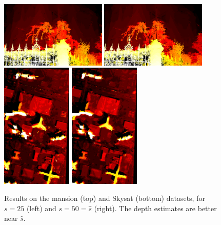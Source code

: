 \documentclass{article}
\theoremstyle{definition}
\begin{document}
\begin{figure}[ht]
  \centering
  \includegraphics[width=0.45\textwidth]{animate_mansion/1521576787209_dmap_025.png}
  \includegraphics[width=0.45\textwidth]{animate_mansion/1521576787209_dmap_050.png} \\
  
  \includegraphics[width=0.3\textwidth]{animate_skysat_ftc4/1521546364721_dmap_025.png}
  \includegraphics[width=0.3\textwidth]{animate_skysat_ftc4/1521546364721_dmap_050.png}
  \caption{Results on the mansion (top) and Skysat (bottom) datasets, for $s=25$ (left) and $s=50=\widehat{s}$ (right). The depth estimates are better near $\widehat{s}$.}
  \label{fig:finetocoarse:res}
\end{figure}
\end{document}
